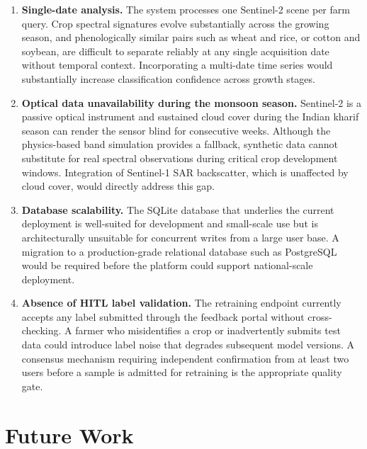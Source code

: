 \documentclass[12pt,a4paper,oneside]{report}
\begin{document}
\begin{enumerate}

  \item \textbf{Single-date analysis.}
        The system processes one Sentinel-2 scene per farm query. Crop spectral
        signatures evolve substantially across the growing season, and phenologically
        similar pairs such as wheat and rice, or cotton and soybean, are difficult
        to separate reliably at any single acquisition date without temporal context.
        Incorporating a multi-date time series would substantially increase
        classification confidence across growth stages.

  \item \textbf{Optical data unavailability during the monsoon season.}
        Sentinel-2 is a passive optical instrument and sustained cloud cover during
        the Indian kharif season can render the sensor blind for consecutive weeks.
        Although the physics-based band simulation provides a fallback, synthetic
        data cannot substitute for real spectral observations during critical crop
        development windows. Integration of Sentinel-1 SAR backscatter, which is
        unaffected by cloud cover, would directly address this gap.

  \item \textbf{Database scalability.}
        The SQLite database that underlies the current deployment is well-suited for
        development and small-scale use but is architecturally unsuitable for
        concurrent writes from a large user base. A migration to a production-grade
        relational database such as PostgreSQL would be required before the platform
        could support national-scale deployment.

  \item \textbf{Absence of HITL label validation.}
        The retraining endpoint currently accepts any label submitted through the
        feedback portal without cross-checking. A farmer who misidentifies a crop or
        inadvertently submits test data could introduce label noise that degrades
        subsequent model versions. A consensus mechanism requiring independent
        confirmation from at least two users before a sample is admitted for
        retraining is the appropriate quality gate.

\end{enumerate}

\section{Future Work}
\end{document}
